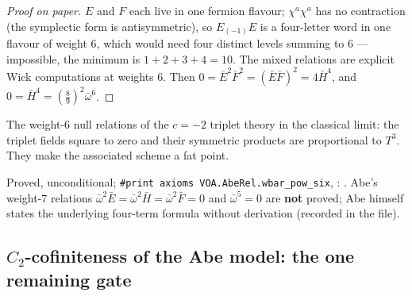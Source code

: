 \begin{proof}[Proof on paper]
$E$ and $F$ each live in one fermion flavour; $\chi^a\chi^a$ has no contraction (the symplectic form is
antisymmetric), so $E_{(-1)}E$ is a four-letter word in one flavour of weight $6$, which would need four
distinct levels summing to $6$ --- impossible, the minimum is $1+2+3+4=10$. The mixed relations are explicit
Wick computations at weights $6$. Then $0=\bar E^2\bar F^2=(\bar E\bar F)^2=4\bar H^4$, and
$0=\bar H^4=(\tfrac89)^2\bar\omega^6$.
\end{proof}
\begin{physics}
The weight-$6$ null relations of the $c=-2$ triplet theory in the classical limit: the triplet fields square to
zero and their symmetric products are proportional to $T^3$. They make the associated scheme a fat point.
\end{physics}
\begin{status}
Proved, unconditional; \texttt{\#print axioms VOA.AbeRel.wbar\_pow\_six}, :
. Abe's weight-$7$ relations $\bar\omega^2\bar E=\bar\omega^2\bar H=\bar\omega^2\bar F=0$
and $\bar\omega^5=0$ are \textbf{not} proved; Abe himself states the underlying four-term formula without derivation
(recorded in the file).
\end{status}

\subsection{\texorpdfstring{$C_2$}{C2}-cofiniteness of the Abe model: the one remaining gate}


